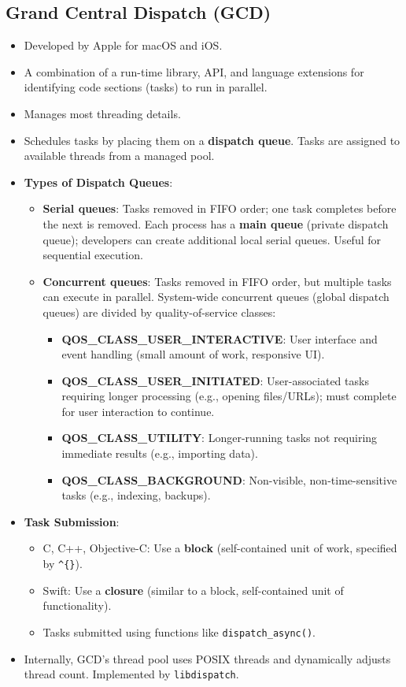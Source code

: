 \subsection{Grand Central Dispatch (GCD)}
\begin{itemize}
    \item Developed by Apple for macOS and iOS.
    \item A combination of a run-time library, API, and language extensions for identifying code sections (tasks) to run in parallel.
    \item Manages most threading details.
    \item Schedules tasks by placing them on a \textbf{dispatch queue}. Tasks are assigned to available threads from a managed pool.
    \item \textbf{Types of Dispatch Queues}:
        \begin{itemize}
            \item \textbf{Serial queues}: Tasks removed in FIFO order; one task completes before the next is removed. Each process has a \textbf{main queue} (private dispatch queue); developers can create additional local serial queues. Useful for sequential execution.
            \item \textbf{Concurrent queues}: Tasks removed in FIFO order, but multiple tasks can execute in parallel. System-wide concurrent queues (global dispatch queues) are divided by quality-of-service classes:
                \begin{itemize}
                    \item \textbf{QOS\_CLASS\_USER\_INTERACTIVE}: User interface and event handling (small amount of work, responsive UI).
                    \item \textbf{QOS\_CLASS\_USER\_INITIATED}: User-associated tasks requiring longer processing (e.g., opening files/URLs); must complete for user interaction to continue.
                    \item \textbf{QOS\_CLASS\_UTILITY}: Longer-running tasks not requiring immediate results (e.g., importing data).
                    \item \textbf{QOS\_CLASS\_BACKGROUND}: Non-visible, non-time-sensitive tasks (e.g., indexing, backups).
                \end{itemize}
        \end{itemize}
    \item \textbf{Task Submission}:
        \begin{itemize}
            \item C, C++, Objective-C: Use a \textbf{block} (self-contained unit of work, specified by \texttt{\^{}\{\}}).
            \item Swift: Use a \textbf{closure} (similar to a block, self-contained unit of functionality).
            \item Tasks submitted using functions like \texttt{dispatch\_async()}.
        \end{itemize}
    \item Internally, GCD's thread pool uses POSIX threads and dynamically adjusts thread count. Implemented by \texttt{libdispatch}.
\end{itemize}

